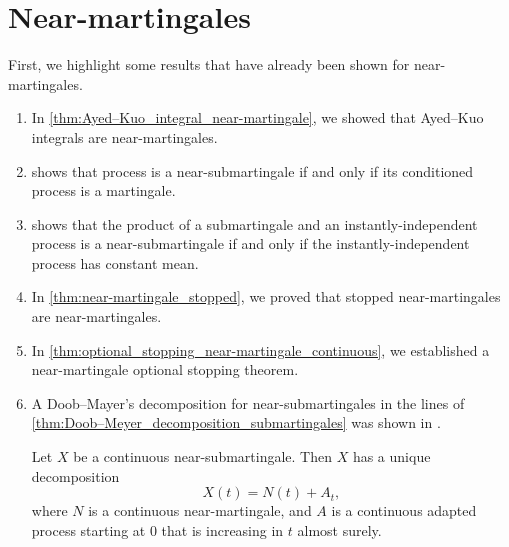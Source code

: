 \section{Near-martingales}
First, we highlight some results that have already been shown for near-martingales.
\begin{enumerate}
    \item  In \cref{thm:Ayed–Kuo_integral_near-martingale}, we showed that Ayed–Kuo integrals are near-martingales.
    \item  {} shows that process is a near-submartingale if and only if its conditioned process is a martingale.
    \item  {} shows that the product of a submartingale and an instantly-independent process is a near-submartingale if and only if the instantly-independent process has constant mean.
    \item  In \cref{thm:near-martingale_stopped}, we proved that stopped near-martingales are near-martingales.
    \item  In \cref{thm:optional_stopping_near-martingale_continuous}, we established a near-martingale optional stopping theorem.
    \item  A Doob–Mayer's decomposition for near-submartingales in the lines of \cref{thm:Doob–Meyer_decomposition_submartingales} was shown in \cite[section 3]{HwangKuoSaitôZhai2017}.
    \begin{theorem}
        Let \( X \) be a continuous near-submartingale. Then \( X \) has a unique decomposition
        \[ X(t) = N(t) + A_t , \]
        where \( N \) is a continuous near-martingale, and \( A \) is a continuous adapted process starting at \( 0 \) that is increasing in \( t \) almost surely.
    \end{theorem}
\end{enumerate}


